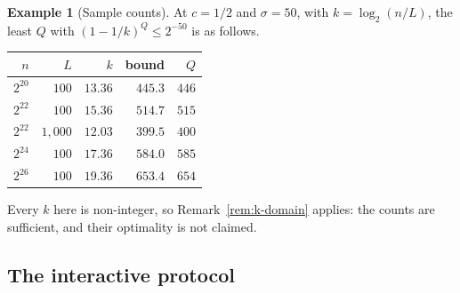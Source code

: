 \documentclass[11pt,a4paper]{article}
\theoremstyle{definition}
\newtheorem{example}[theorem]{Example}
\begin{document}
\begin{example}[Sample counts]\label{ex:sample-count}
At $c=1/2$ and $\sigma=50$, with $k=\log_2(n/L)$, the least $Q$ with
$(1-1/k)^Q\le 2^{-50}$ is as follows.
\begin{center}
\small
\begin{tabular}{@{}r r r r r@{}}
\toprule
$n$ & $L$ & $k$ & bound & $Q$ \\
\midrule
$2^{20}$ & $100$ & $13.36$ & $445.3$ & $446$ \\
$2^{22}$ & $100$ & $15.36$ & $514.7$ & $515$ \\
$2^{22}$ & $1{,}000$ & $12.03$ & $399.5$ & $400$ \\
$2^{24}$ & $100$ & $17.36$ & $584.0$ & $585$ \\
$2^{26}$ & $100$ & $19.36$ & $653.4$ & $654$ \\
\bottomrule
\end{tabular}
\end{center}
Every $k$ here is non-integer, so Remark~\ref{rem:k-domain} applies: the
counts are sufficient, and their optimality is not claimed.
\end{example}

\subsection{The interactive protocol}\label{sec:protocol-interactive}
\end{document}
